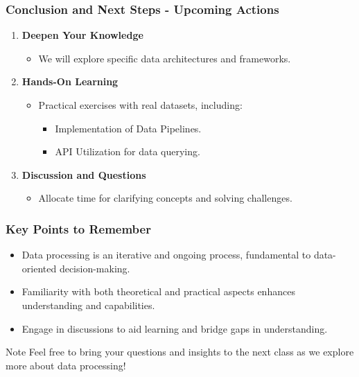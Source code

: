 \documentclass[aspectratio=169]{beamer}
\begin{document}
\begin{frame}[fragile]
  \frametitle{Conclusion and Next Steps - Upcoming Actions}
  
  \begin{enumerate}
      \item \textbf{Deepen Your Knowledge}  
        \begin{itemize}
            \item We will explore specific data architectures and frameworks.
        \end{itemize}

      \item \textbf{Hands-On Learning}  
        \begin{itemize}
            \item Practical exercises with real datasets, including:
                \begin{itemize}
                    \item Implementation of Data Pipelines.
                    \item API Utilization for data querying.
                \end{itemize}
        \end{itemize}

      \item \textbf{Discussion and Questions}  
        \begin{itemize}
            \item Allocate time for clarifying concepts and solving challenges.
        \end{itemize}
  \end{enumerate}
\end{frame}

\begin{frame}[fragile]
  \frametitle{Key Points to Remember}
  
  \begin{itemize}
      \item Data processing is an iterative and ongoing process, fundamental to data-oriented decision-making.
      \item Familiarity with both theoretical and practical aspects enhances understanding and capabilities.
      \item Engage in discussions to aid learning and bridge gaps in understanding.
  \end{itemize}

  \begin{block}{Note}
    Feel free to bring your questions and insights to the next class as we explore more about data processing!
  \end{block}
\end{frame}
\end{document}
